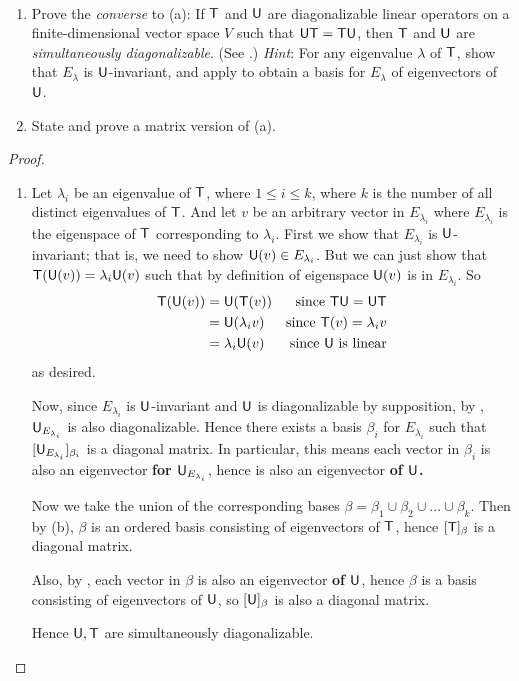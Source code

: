 \begin{exercise} \label{exercise 5.4.25} \ 

\begin{enumerate}
\item Prove the \emph{converse} to (a): If \(\textsf{T}\) and \(\textsf{U}\) are diagonalizable linear operators on a finite-dimensional vector space \(V\) such that \(\textsf{U}\textsf{T} = \textsf{T}\textsf{U}\), then \(\textsf{T}\) and \(\textsf{U}\) are \emph{simultaneously diagonalizable}.
(See .)
\emph{Hint}: For any eigenvalue \(\lambda\) of \(\textsf{T}\), show that \(E_{\lambda}\) is \(\textsf{U}\)-invariant, and apply  to obtain a basis for \(E_{\lambda}\) of eigenvectors of \(\textsf{U}\).
\item State and prove a matrix version of (a).
\end{enumerate}
\end{exercise}

\begin{proof} \ 

\begin{enumerate}
\item

Let \(\lambda_i\) be an eigenvalue of \(\textsf{T}\), where \(1 \le i \le k\), where \(k\) is the number of all distinct eigenvalues of \(\textsf{T}\).
And let \(v\) be an arbitrary vector in \(E_{\lambda_i}\) where \(E_{\lambda_i}\) is the eigenspace of \(\textsf{T}\) corresponding to \(\lambda_i\).
First we show that \(E_{\lambda_i}\) is \(\textsf{U}\)-invariant; that is, we need to show \(\textsf{U}(v) \in E_{\lambda_i}\).
But we can just show that \(\textsf{T}(\textsf{U}(v)) = \lambda_i \textsf{U}(v)\) such that by definition of eigenspace \(\textsf{U}(v)\) is in \(E_{\lambda_i}\).
So
\begin{align*}
    \textsf{T}(\textsf{U}(v))
        & = \textsf{U}(\textsf{T}(v)) & \text{since \(\textsf{T}\textsf{U}= \textsf{U}\textsf{T}\)} \\
        & = \textsf{U}( \lambda_i v ) & \text{since \(\textsf{T}(v) = \lambda_i v\)} \\
        & = \lambda_i \textsf{U}(v) & \text{since \(\textsf{U}\) is linear}
\end{align*}
as desired.

Now, since \(E_{\lambda_i}\) is \(\textsf{U}\)-invariant and \(\textsf{U}\) is diagonalizable by supposition, by , \(\textsf{U}_{E_{\lambda_i}}\) is also diagonalizable.
Hence there exists a basis \(\beta_i\) for \(E_{\lambda_i}\) such that \([\textsf{U}_{E_{\lambda_i}}]_{\beta_i}\) is a diagonal matrix.
In particular, this means each vector in \(\beta_i\) is also an eigenvector \textbf{for \(\textsf{U}_{E_{\lambda_i}}\)}, hence is also an eigenvector \textbf{of \(\textsf{U}\).} 


Now we take the union of the corresponding bases \(\beta = \beta_1 \cup \beta_2 \cup ... \cup \beta_k\).
Then by (b), \(\beta\) is an ordered basis consisting of eigenvectors of \(\textsf{T}\), hence \([\textsf{T}]_{\beta}\) is a diagonal matrix.

Also, by , each vector in \(\beta\) is also an eigenvector \textbf{of \(\textsf{U}\)}, hence \(\beta\) is a basis consisting of eigenvectors of \(\textsf{U}\), so \([\textsf{U}]_{\beta}\) is also a diagonal matrix.

Hence \(\textsf{U}, \textsf{T}\) are simultaneously diagonalizable.
\end{enumerate}
\end{proof}


